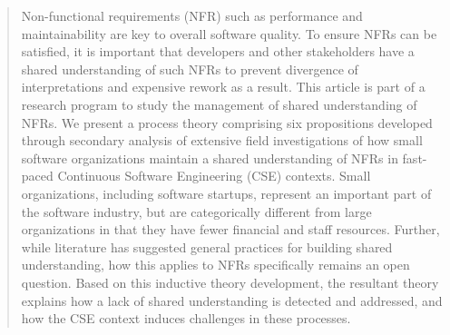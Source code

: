\documentclass[smallextended]{svjour3}        %
\providecommand{\DIFaddbegin}{} %
\providecommand{\DIFaddend}{} %
\newcommand{\DIFaddincludegraphics}[2][]{{\color{blue}\fbox{\DIFOincludegraphics[#1]{#2}}}} %
\DeclareRobustCommand{\DIFaddbegin}{\DIFOaddbegin \let\includegraphics\DIFaddincludegraphics} %
\DeclareRobustCommand{\DIFaddend}{\DIFOaddend \let\includegraphics\DIFOincludegraphics} %
\begin{document}
\maketitle

\begin{abstract}
\DIFaddbegin \leavevmode\par
\vspace*{-0.5ex}
\noindent
\DIFaddend Non-functional requirements (NFR) such as performance and maintainability are key to overall software quality. To ensure NFRs can be satisfied, it is important that developers and other stakeholders have a shared understanding of such NFRs to prevent divergence of interpretations and expensive rework as a result. 
This article is part of a research program to study the management of shared understanding of NFRs. We present a process theory comprising six propositions developed through secondary analysis of extensive field investigations of how small software organizations maintain a shared understanding of NFRs in fast-paced Continuous Software Engineering (CSE) contexts. Small organizations, including software startups, represent an important part of the software industry, but are categorically different from large organizations in that they have fewer financial and staff resources. 
Further, while literature has suggested general practices for building shared understanding, how this applies to NFRs specifically remains an open question.  
Based on this inductive theory development, the resultant theory explains how a lack of shared understanding is detected and addressed, and how the CSE context induces challenges in these processes.
\end{abstract}

\DIFaddbegin {}
\end{document}
